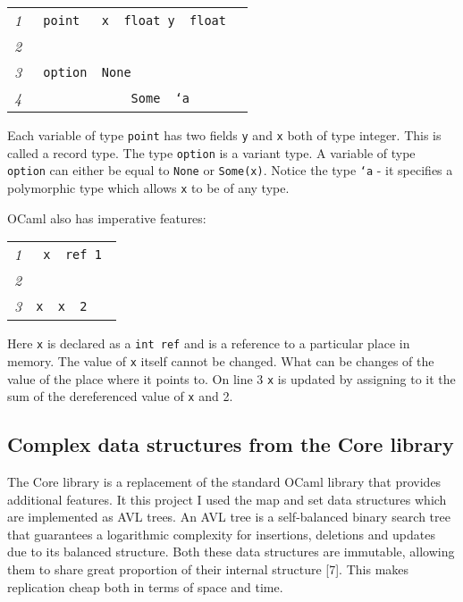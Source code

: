 \documentclass[12pt,twoside,notitlepage]{report}
\newcommand{\mlkeywordA}[1]{\mbox{\color{cyan}{\textbf{\texttt{#1}}}}}
\newcommand{\mlkeyword}[1]{\mbox{\color{red}{#1}}}
\newcommand{\mloperator}[1]{\mbox{\color{darkgreen}{#1}}}
\newcommand{\mlcodeline}[2]{\tiny\sl #1 & \begin{minipage}[c]{0.8\linewidth}\begin{alltt}\mbox{#2}\end{alltt}\end{minipage}\\}
\begin{document}
{\scriptsize\noindent\begin{longtable}{r|l}
\mlcodeline{1}{\mlkeyword{type}~point~\mlkeyword{=}~\mloperator{\{}~x~\mloperator{\mbox{\COLON}}~float\mloperator{\mbox{\SC}}~y~\mloperator{\mbox{\COLON}}~float~\mloperator{\}}
}
\mlcodeline{2}{
}
\mlcodeline{3}{\mlkeyword{type}~option~\mlkeyword{=}~None
}
\mlcodeline{4}{~~~~~~~~~~~~~\mloperator{|}Some~\mlkeyword{of}~`a
}
\end{longtable}
}
Each variable of type {\tt point} has two fields {\tt y} and {\tt x} both of type integer. This is called a record type. The type {\tt option} is a variant type. A variable of type {\tt option} can either be equal to {\tt None} or {\tt Some(x)}. Notice the type {\tt `a} - it specifies a polymorphic type which allows {\tt x} to be of any type.

OCaml also has imperative features:



{\scriptsize\noindent\begin{longtable}{r|l}
\mlcodeline{1}{\mlkeywordA{let}~x~\mlkeyword{=}~ref~1
}
\mlcodeline{2}{
}
\mlcodeline{3}{x~\mloperator{\mbox{\COLON}{}=}~\mloperator{\mbox{}\hspace{0pt}{!}\hspace{0pt}}x~\mloperator{+}~2~
}
\end{longtable}
}

Here {\tt x} is declared as a {\tt int ref} and is a reference to a particular place in memory. The value of {\tt x} itself cannot be changed. What can be changes of the value of the place where it points to. On line 3 {\tt x} is updated by assigning to it the sum of the dereferenced value of {\tt x} and 2.  


\subsection{Complex data structures from the Core library}
\label{datastruct_core}
The Core library is a replacement of the standard OCaml library that provides additional features. It this project I used the map and set data structures which are implemented as AVL trees. An AVL tree is a self-balanced binary search tree that guarantees a logarithmic complexity for insertions, deletions and updates due to its balanced structure. Both these data structures are immutable, allowing them to share great proportion of their internal structure [7]. This makes replication cheap both in terms of space and time. 
\end{document}
